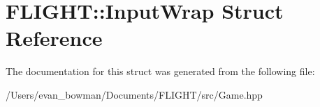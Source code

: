 \hypertarget{struct_f_l_i_g_h_t_1_1_input_wrap}{}\section{F\+L\+I\+G\+HT\+:\+:Input\+Wrap Struct Reference}
\label{struct_f_l_i_g_h_t_1_1_input_wrap}


The documentation for this struct was generated from the following file\+:\begin{DoxyCompactItemize}
\item 
/\+Users/evan\+\_\+bowman/\+Documents/\+F\+L\+I\+G\+H\+T/src/Game.\+hpp\end{DoxyCompactItemize}
